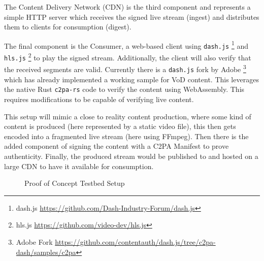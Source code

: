 \documentclass[a4paper]{article}
\begin{document}
The Content Delivery Network (CDN) is the third component and represents a simple HTTP server which receives the signed live stream (ingest) and distributes them to clients for consumption (digest).

The final component is the Consumer, a web-based client using \texttt{dash.js} \footnote{dash.js \url{https://github.com/Dash-Industry-Forum/dash.js}} and \texttt{hls.js} \footnote{hls.js \url{https://github.com/video-dev/hls.js}} to play the signed stream. Additionally, the client will also verify that the received segments are valid. Currently there is a \texttt{dash.js} fork by Adobe \footnote{Adobe Fork \url{https://github.com/contentauth/dash.js/tree/c2pa-dash/samples/c2pa}} which has already implemented a working sample for VoD content. This leverages the native Rust \texttt{c2pa-rs} code to verify the content using WebAssembly. This requires modifications to be capable of verifying live content.

This setup will mimic a close to reality content production, where some kind of content is produced (here represented by a static video file), this then gets encoded into a fragmented live stream (here using FFmpeg). Then there is the added component of signing the content with a C2PA Manifest to prove authenticity. Finally, the produced stream would be published to and hosted on a large CDN to have it available for consumption.

\begin{figure}
    \centering
    \caption{Proof of Concept Testbed Setup}
    \label{fig:setup}
\end{figure}
\end{document}
